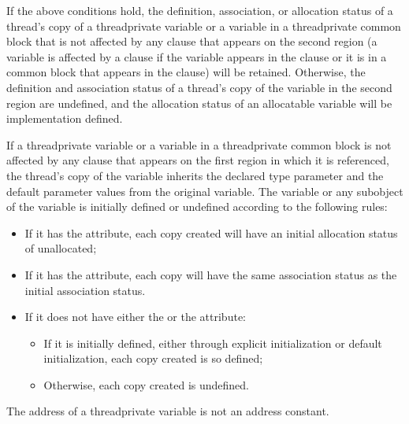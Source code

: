 \begin{fortranspecific}
If the above conditions hold, the definition, association, or allocation 
status of a thread's copy of a threadprivate variable or a variable in a 
threadprivate common block that is not affected by any  clause 
that appears on the second region (a variable is affected by a  
clause if the variable appears in the  clause or it is in a 
common block that appears in the  clause) will be retained.
Otherwise, the definition and association status of a thread's copy of the 
variable in the second region are undefined, and the allocation status of 
an allocatable variable will be implementation defined.

If a threadprivate variable or a variable in a threadprivate common block is
not affected by any  clause that appears on the first  
region in which it is referenced, the thread's copy of the variable inherits the
declared type parameter and the default parameter values from the original variable.  
The variable or any subobject of the variable is initially defined or
undefined according to the following rules:

\begin{itemize}
\item If it has the  attribute, each copy created will have 
      an initial allocation status of unallocated;
\item If it has the  attribute, each copy will have the
      same association status as the initial association status.
\item If it does not have either the  or the  
      attribute:

\begin{samepage}
\begin{itemize}
\item If it is initially defined, either through explicit initialization or default
      initialization, each copy created is so defined;
\item Otherwise, each copy created is undefined.
\end{itemize}
\end{samepage}
\end{itemize}
\end{fortranspecific}

\begin{ccppspecific}
The address of a threadprivate variable is not an address constant.
\end{ccppspecific}


